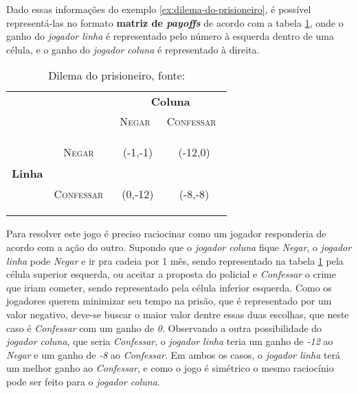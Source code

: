 Dado essas informações do exemplo \ref{ex:dilema-do-prisioneiro}, é possível representá-las no formato {\bfseries matriz de \emph{payoffs}} de acordo com a tabela \ref{tab:dilema-prisioneiro}, onde o ganho do \emph{jogador linha} é representado pelo número à esquerda dentro de uma célula, e o ganho do \emph{jogador coluna} é representado à direita.

\begin{table}[ht]
\centering
\begin{tabular}{|c|c|c|c|}
	\cline{3-4}
	\multicolumn{1}{c}{} &  & \multicolumn{2}{c|}{{\bfseries Coluna}}\tabularnewline
	\cline{3-4}
	\multicolumn{1}{c}{} &  & {\scshape Negar}\  & {\scshape Confessar}\ \tabularnewline
	\hline
	\multirow{2}{*}{\begin{turn}{90}
	{\bfseries Linha}
	\end{turn}} & \begin{turn}{90}
	{\scshape Negar}\
	\end{turn} & {\Large(}{\Large -1,}{\Large -1)} & {\Large(}{\Large -12,}{\Large 0)}\tabularnewline
	\cline{2-4}
	 & \begin{turn}{90}
	{\scshape Confessar}\
	\end{turn} & {\Large(}{\Large 0,}{\Large -12)} & {\Large(}{\Large -8,}{\Large -8)}\tabularnewline
	\hline
\end{tabular}
\caption{Dilema do prisioneiro, fonte: \cite{spaniel_2011}}
\label{tab:dilema-prisioneiro}
\end{table}

Para resolver este jogo é preciso raciocinar como um jogador responderia de acordo com a ação do outro. Supondo que o \emph{jogador coluna} fique \emph{Negar}, o \emph{jogador linha} pode \emph{Negar} e ir pra cadeia por 1 mês, sendo representado na tabela \ref{tab:dilema-prisioneiro} pela célula superior esquerda, ou aceitar a proposta do policial e \emph{Confessar} o crime que iriam cometer, sendo representado pela célula inferior esquerda. Como os jogadores querem minimizar seu tempo na prisão, que é representado por um valor negativo, deve-se buscar o maior valor dentre essas duas escolhas, que neste caso é \emph{Confessar} com um ganho de \emph{0}. Observando a outra possibilidade do \emph{jogador coluna}, que seria \emph{Confessar}, o \emph{jogador linha} teria um ganho de \emph{-12} ao \emph{Negar} e um ganho de \emph{-8} ao \emph{Confessar}. Em ambos os casos, o \emph{jogador linha} terá um melhor ganho ao \emph{Confessar}, e como o jogo é simétrico o mesmo raciocínio pode ser feito para o \emph{jogador coluna}.

